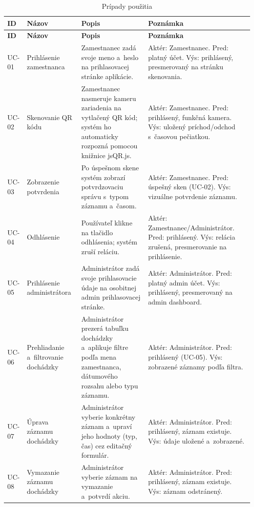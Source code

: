 \renewcommand{\arraystretch}{1.12}
\setlength{\tabcolsep}{3pt}
\footnotesize
\begin{longtable}{|p{1.1cm}|p{3.2cm}|p{6.2cm}|p{4.2cm}|}
\caption{Prípady použitia}\label{t:use-cases}\\
\hline
\textbf{ID} & \textbf{Názov} & \textbf{Popis} & \textbf{Poznámka} \\
\hline
\endfirsthead
\hline
\textbf{ID} & \textbf{Názov} & \textbf{Popis} & \textbf{Poznámka} \\
\hline
\endhead
UC-01 & Prihlásenie zamestnanca &
Zamestnanec zadá svoje meno a~heslo na prihlasovacej stránke aplikácie. &
Aktér: Zamestnanec. Pred: platný účet. Výs: prihlásený, presmerovaný na stránku skenovania. \\
\hline
UC-02 & Skenovanie QR kódu &
Zamestnanec nasmeruje kameru zariadenia na vytlačený QR kód; systém ho
automaticky rozpozná pomocou knižnice jsQR.js. &
Aktér: Zamestnanec. Pred: prihlásený, funkčná kamera. Výs: uložený príchod/odchod s~časovou pečiatkou. \\
\hline
UC-03 & Zobrazenie potvrdenia &
Po úspešnom skene systém zobrazí potvrdzovaciu správu s~typom záznamu a~časom. &
Aktér: Zamestnanec. Pred: úspešný sken (UC-02). Výs: vizuálne potvrdenie záznamu. \\
\hline
UC-04 & Odhlásenie &
Používateľ klikne na tlačidlo odhlásenia; systém zruší reláciu. &
Aktér: Zamestnanec/Administrátor. Pred: prihlásený. Výs: relácia zrušená, presmerovanie na prihlásenie. \\
\hline
UC-05 & Prihlásenie administrátora &
Administrátor zadá svoje prihlasovacie údaje na osobitnej admin prihlasovacej
stránke. &
Aktér: Administrátor. Pred: platný admin účet. Výs: prihlásený, presmerovaný na admin dashboard. \\
\hline
UC-06 & Prehliadanie a~filtrovanie dochádzky &
Administrátor prezerá tabuľku dochádzky a~aplikuje filtre podľa mena zamestnanca,
dátumového rozsahu alebo typu záznamu. &
Aktér: Administrátor. Pred: prihlásený (UC-05). Výs: zobrazené záznamy podľa filtra. \\
\hline
UC-07 & Úprava záznamu dochádzky &
Administrátor vyberie konkrétny záznam a~upraví jeho hodnoty (typ, čas) cez
editačný formulár. &
Aktér: Administrátor. Pred: prihlásený, záznam existuje. Výs: údaje uložené a~zobrazené. \\
\hline
UC-08 & Vymazanie záznamu dochádzky &
Administrátor vyberie záznam na vymazanie a~potvrdí akciu. &
Aktér: Administrátor. Pred: prihlásený, záznam existuje. Výs: záznam odstránený. \\

\end{longtable}
